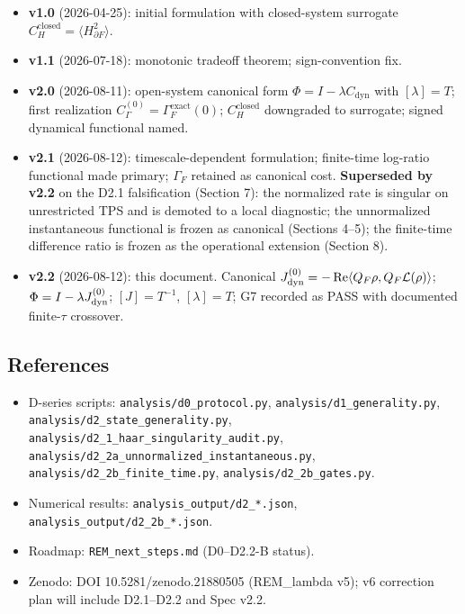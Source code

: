 \documentclass[
]{article}
\providecommand{\tightlist}{%
  \setlength{\itemsep}{0pt}\setlength{\parskip}{0pt}}
\begin{document}
\begin{itemize}
\tightlist
\item
  \textbf{v1.0} (2026-04-25): initial formulation with closed-system
  surrogate \(C_H^{\mathrm{closed}} = \langle H_{\partial F}^2\rangle\).
\item
  \textbf{v1.1} (2026-07-18): monotonic tradeoff theorem;
  sign-convention fix.
\item
  \textbf{v2.0} (2026-08-11): open-system canonical form
  \(\Phi = I - \lambda C_{\mathrm{dyn}}\) with \([\lambda]=T\); first
  realization \(C_\Gamma^{(0)} = \Gamma_F^{\mathrm{exact}}(0)\);
  \(C_H^{\mathrm{closed}}\) downgraded to surrogate; signed dynamical
  functional named.
\item
  \textbf{v2.1} (2026-08-12): timescale-dependent formulation;
  finite-time log-ratio functional made primary; \(\Gamma_F\) retained
  as canonical cost. \textbf{Superseded by v2.2} on the D2.1
  falsification (Section 7): the normalized rate is singular on
  unrestricted TPS and is demoted to a local diagnostic; the
  unnormalized instantaneous functional is frozen as canonical (Sections
  4--5); the finite-time difference ratio is frozen as the operational
  extension (Section 8).
\item
  \textbf{v2.2} (2026-08-12): this document. Canonical
  \(J_{\rm dyn}^{(0)} = -\operatorname{Re}\langle Q_F\rho, Q_F\mathcal L(\rho)\rangle\);
  \(\Phi = I - \lambda J_{\rm dyn}^{(0)}\); \([J] = T^{-1}\),
  \([\lambda]=T\); G7 recorded as PASS with documented finite-\(\tau\)
  crossover.
\end{itemize}

\subsection{References}\label{references}

\begin{itemize}
\tightlist
\item
  D-series scripts: \texttt{analysis/d0\_protocol.py},
  \texttt{analysis/d1\_generality.py},
  \texttt{analysis/d2\_state\_generality.py},
  \texttt{analysis/d2\_1\_haar\_singularity\_audit.py},
  \texttt{analysis/d2\_2a\_unnormalized\_instantaneous.py},
  \texttt{analysis/d2\_2b\_finite\_time.py},
  \texttt{analysis/d2\_2b\_gates.py}.
\item
  Numerical results: \texttt{analysis\_output/d2\_*.json},
  \texttt{analysis\_output/d2\_2b\_*.json}.
\item
  Roadmap: \texttt{REM\_next\_steps.md} (D0--D2.2-B status).
\item
  Zenodo: DOI 10.5281/zenodo.21880505 (REM\_lambda v5); v6 correction
  plan will include D2.1--D2.2 and Spec v2.2.
\end{itemize}
\end{document}
